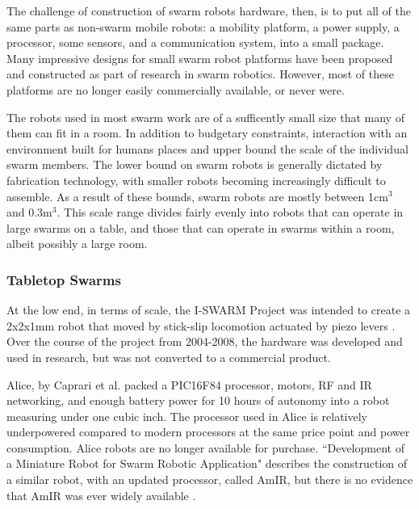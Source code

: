 \documentclass[]{article}
\begin{document}
The challenge of construction of swarm robots hardware, then, is to put all of the same parts as non-swarm mobile robots: a mobility platform, a power supply, a processor, some sensors, and a communication system, into a small package.
Many impressive designs for small swarm robot platforms have been proposed and constructed as part of research in swarm robotics. 
However, most of these platforms are no longer easily commercially available, or never were. 

The robots used in most swarm work are of a sufficently small size that many of them can fit in a room. In addition to budgetary constraints, interaction with an environment built for humans places and upper bound the scale of the individual swarm members.  
The lower bound on swarm robots is generally dictated by fabrication technology, with smaller robots becoming increasingly difficult to assemble. 
As a result of these bounds, swarm robots are mostly between 1cm$^3$ and 0.3m$^3$. 
This scale range divides fairly evenly into robots that can operate in large swarms on a table, and those that can operate in swarms within a room, albeit possibly a large room. 

\subsubsection{Tabletop Swarms}

At the low end, in terms of scale, the I-SWARM Project was intended to create a 2x2x1mm robot that moved by stick-slip locomotion actuated by piezo levers \cite{seyfried2005swarm}. 
Over the course of the project from 2004-2008, the hardware was developed and used in research, but was not converted to a commercial product. 

Alice, by Caprari et al. \cite{caprari1998autonomous} packed a PIC16F84 processor, motors, RF and IR networking, and enough battery power for 10 hours of autonomy into a robot measuring under one cubic inch. 
The processor used in Alice is relatively underpowered compared to modern processors at the same price point and power consumption. 
Alice robots are no longer available for purchase. 
``Development of a Miniature Robot for Swarm Robotic Application" describes the construction of a similar robot, with an updated processor, called AmIR, but there is no evidence that AmIR was ever widely available \cite{arvin2009development}.
\end{document}
